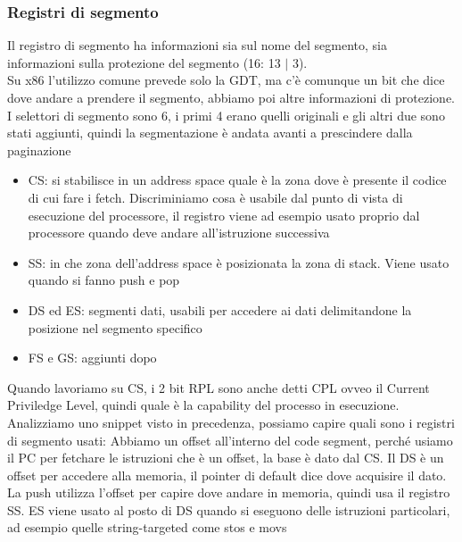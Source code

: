 \documentclass[12pt, oneside]{extbook}
\begin{document}
\subsubsection{Registri di segmento}
Il registro di segmento ha informazioni sia sul nome del segmento, sia informazioni sulla protezione del segmento (16: 13 $|$ 3).\\ Su x86 l'utilizzo comune prevede solo la GDT, ma c'è comunque un bit che dice dove andare a prendere il segmento, abbiamo poi altre informazioni di protezione. I selettori di segmento sono 6, i primi 4 erano quelli originali e gli altri due sono stati aggiunti, quindi la segmentazione è andata avanti a prescindere dalla paginazione
\begin{itemize}
\item CS: si stabilisce in un address space quale è la zona dove è presente il codice di cui fare i fetch. Discriminiamo cosa è usabile dal punto di vista di esecuzione del processore, il registro viene ad esempio usato proprio dal processore quando deve andare all'istruzione successiva
\item SS: in che zona dell'address space è posizionata la zona di stack. Viene usato quando si fanno push e pop
\item DS ed ES: segmenti dati, usabili per accedere ai dati delimitandone la posizione nel segmento specifico
\item FS e GS: aggiunti dopo
\end{itemize}
Quando lavoriamo su CS, i 2 bit RPL sono anche detti CPL ovveo il Current Priviledge Level, quindi quale è la capability del processo in esecuzione.\\ Analizziamo uno snippet visto in precedenza, possiamo capire quali sono i registri di segmento usati:
Abbiamo un offset all'interno del code segment, perché usiamo il PC per fetchare le istruzioni che è un offset, la base è dato dal CS. Il DS è un offset per accedere alla memoria, il pointer di default dice dove acquisire il dato. La push utilizza l'offset per capire dove andare in memoria, quindi usa il registro SS. ES viene usato al posto di DS quando si eseguono delle istruzioni particolari, ad esempio quelle string-targeted come \textsf{stos} e \textsf{movs}
\end{document}
